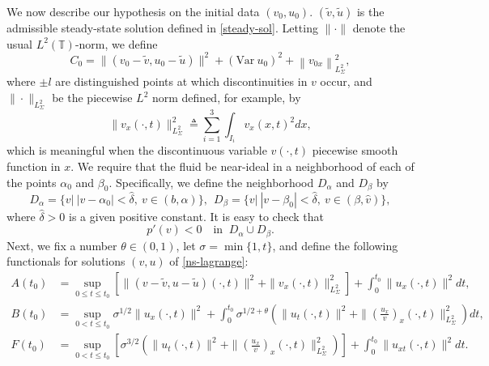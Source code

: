 \documentclass[a4paper,oneside,11pt]{article}
\numberwithin{equation}{section}
\begin{document}
We now describe our hypothesis on the initial data $(v_0,u_0)$. $(\tilde{v},\tilde{u})$ is the admissible steady-state solution defined in \eqref{steady-sol}. Letting \(\parallel  \cdot  \parallel\) denote the usual \(L^{2}\left( \mathbb{T}\right)\)-norm, we define
\begin{equation}\label{eq:C0}
	C_{0}= \|(v_0-\tilde{v},u_0-\tilde{u})\|^{2}+ \left(\textrm{Var}~u_{0}\right)^{2}+ \left\|v_{0x}\right\|_{L^2_\Sigma}^{2},
\end{equation}
where $\pm l$ are distinguished points at which discontinuities in $v$ occur, and $\|\cdot\|_{L^2_\Sigma}$%
be the piecewise $L^2$ norm defined, for example, by
$$
\| v_x(\cdot, t)\|_{L^2_\Sigma}^2 \triangleq \sum_{i=1}^3\int_{I_i} v_x(x, t)^2 d x, %
$$
which is meaningful when the discontinuous variable $v(\cdot, t)$ piecewise smooth function in $x$. 
We require that the fluid be near-ideal in a neighborhood of each of the points $\alpha_0$ and $\beta_0$. Specifically, we define the neighborhood $D_\alpha$ and $D_\beta$ by
\begin{equation}\label{eq:dd}
	D_\alpha=\{v\big|~|v-\alpha_0|<{\hat{\delta}},~v\in (b,\alpha)\},~~
	D_\beta=\{v\big|~|v-\beta_0|<{\hat{\delta}},~v\in (\beta,\hat{v})\},
\end{equation}
where $\hat{\delta}>0$ is a given positive constant. It is easy to check that
\begin{equation}\label{p-assume2}
  p'(v) < 0~~~\text{ in }~D_\alpha \cup D_\beta.
\end{equation}
Next, we fix a number $\theta \in (0,1)$,  let $\sigma = \min\{1, t\}$, and define the following functionals for solutions $(v, u)$ of \eqref{ns-lagrange}:
\begin{align}
	A(t_0) &= \sup_{0 \leq t \leq t_0} \left[\|(v-\tilde{v}, u-\tilde{u})(\cdot, t)\|^2 + \|v_x(\cdot, t)\|_{L^2_\Sigma}^2\right] + \int_0^{t_0} \|u_x(\cdot, t)\|^2d t, \label{eq:A} \\
	B(t_0) &= \sup_{0 < t \leq t_0} \sigma^{1/2} \|u_x(\cdot, t)\|^2 
	+ \int_0^{t_0} \sigma^{1/2+\theta} \left(\|u_t(\cdot, t)\|^2 + \|\left(\frac{u_x}{v}\right)_x(\cdot, t)\|_{L^2_\Sigma}^2\right) d t, \label{eq:B}\\
	F(t_0) &= \sup_{0 < t \leq t_0} \left[\sigma^{3/2} \left(\|u_t(\cdot, t)\|^2 + \|\left(\frac{u_x}{v}\right)_x(\cdot, t)\|_{L^2_\Sigma}^2\right)\right] + \int_0^{t_0} \|u_{xt}(\cdot, t)\|^2  d t. \label{eq:F}
\end{align}
\end{document}

